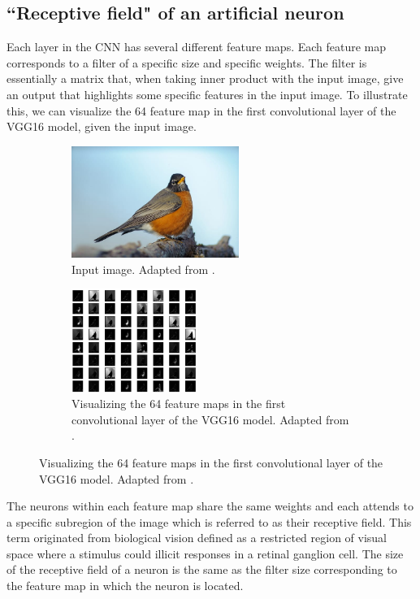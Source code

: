 \subsection{``Receptive field" of an artificial neuron}
Each layer in the CNN has several different feature maps. Each feature map corresponds to a filter of a specific size and specific weights. The filter is essentially a matrix that, when taking inner product with the input image, give an output that highlights some specific features in the input image. To illustrate this, we can visualize the 64 feature map in the first convolutional layer of the VGG16 model, given the input image.
\begin{figure}[H]
\centering
\begin{subfigure}[b]{0.3\textwidth}
        \centering
  \includegraphics[width=0.6\textwidth]{figures/artificial/bird.jpg}
\caption{Input image. Adapted from \cite{feature_map}.}
\end{subfigure}
\hfill
\begin{subfigure}[b]{0.65\textwidth}
\centering
    \includegraphics[width=0.45\textwidth]{figures/artificial/feature_map_vgg16.png}
    \caption{Visualizing the 64 feature maps in the first convolutional layer of the VGG16 model. Adapted from \cite{feature_map}.}
\end{subfigure}
\end{figure} 

The neurons within each feature map share the same weights and each attends to a specific subregion of the image which is referred to as their receptive field. This term originated from biological vision defined as a restricted region of visual space where a stimulus could illicit responses in a retinal ganglion cell. The size of the receptive field of a neuron is the same as the filter size corresponding to the feature map in which the neuron is located. 

